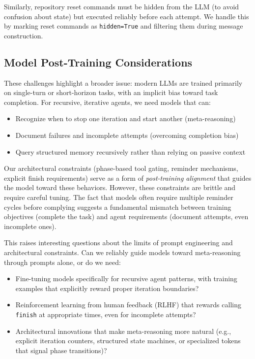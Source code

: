 \documentclass{article}
\theoremstyle{plain}
\theoremstyle{definition}
\theoremstyle{remark}
\begin{document}
Similarly, repository reset commands must be hidden from the LLM (to avoid confusion about state) but executed reliably before each attempt. We handle this by marking reset commands as \texttt{hidden=True} and filtering them during message construction.

\subsection{Model Post-Training Considerations}
These challenges highlight a broader issue: modern LLMs are trained primarily on single-turn or short-horizon tasks, with an implicit bias toward task completion. For recursive, iterative agents, we need models that can:
\begin{itemize}
    \item Recognize when to stop one iteration and start another (meta-reasoning)
    \item Document failures and incomplete attempts (overcoming completion bias)
    \item Query structured memory recursively rather than relying on passive context
\end{itemize}

Our architectural constraints (phase-based tool gating, reminder mechanisms, explicit finish requirements) serve as a form of \emph{post-training alignment} that guides the model toward these behaviors. However, these constraints are brittle and require careful tuning. The fact that models often require multiple reminder cycles before complying suggests a fundamental mismatch between training objectives (complete the task) and agent requirements (document attempts, even incomplete ones).

This raises interesting questions about the limits of prompt engineering and architectural constraints. Can we reliably guide models toward meta-reasoning through prompts alone, or do we need:
\begin{itemize}
    \item Fine-tuning models specifically for recursive agent patterns, with training examples that explicitly reward proper iteration boundaries?
    \item Reinforcement learning from human feedback (RLHF) that rewards calling \texttt{finish} at appropriate times, even for incomplete attempts?
    \item Architectural innovations that make meta-reasoning more natural (e.g., explicit iteration counters, structured state machines, or specialized tokens that signal phase transitions)?
\end{itemize}
\end{document}
